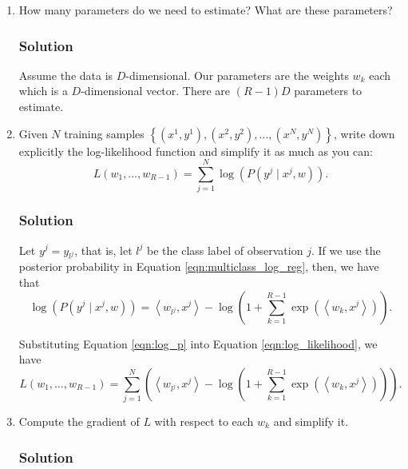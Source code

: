 \documentclass[letterpaper,11pt]{article}
\begin{document}
\begin{enumerate}
\item How many parameters do we need to estimate? What are these
  parameters?

  \subsubsection*{Solution}

  Assume the data is $D$-dimensional. Our parameters are the weights
  $w_k$ each which is a $D$-dimensional vector. There are
  $\boxed{(R - 1)D}$ parameters to estimate.
\item Given $N$ training samples
  $\left\{\left(x^1, y^1\right),\left(x^2,
      y^2\right),\ldots,\left(x^N, y^N\right)\right\}$, write down
  explicitly the log-likelihood function and simplify it as much as
  you can:
  \begin{equation}
    L\left(w_1,\ldots,w_{R-1}\right) = \sum_{j=1}^N \log\left(
      P\left(y^j \mid x^j,w\right)
    \right).
    \label{eqn:log_likelihood}
  \end{equation}
  
  \subsubsection*{Solution}

  Let $y^j = y_{l^j}$, that is, let $l^j$ be the class label of observation
  $j$. If we use the posterior probability in Equation
  \ref{eqn:multiclass_log_reg}, then, we have that
  \begin{equation}
    \log\left(
      P\left(y^j \mid x^j,w\right)
    \right)
    = \left\langle w_{l^j}, x^j\right\rangle -
    \log\left(
      1 + \sum_{k=1}^{R - 1}\exp\left(
        \left\langle w_k, x^j\right\rangle
      \right)
    \right).
    \label{eqn:log_p}
  \end{equation}

  Substituting Equation \ref{eqn:log_p} into Equation \ref{eqn:log_likelihood}, we have
  \begin{equation}
    L\left(w_1,\ldots,w_{R-1}\right)
    = \sum_{j=1}^N\left(
      \left\langle w_{l^j}, x^j\right\rangle
      -
      \log\left(
      1 + \sum_{k=1}^{R-1}\exp\left(\left\langle w_k,x^j\right\rangle\right)
      \right)
    \right).
    \label{eqn:log_p_simple}
  \end{equation}
\item Compute the gradient of $L$ with respect to each $w_k$ and simplify it.
  \subsubsection*{Solution}


\end{enumerate}
\end{document}
